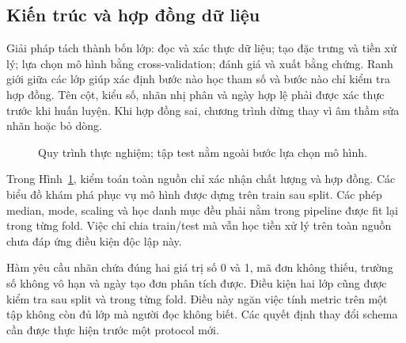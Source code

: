 \subsection{Kiến trúc và hợp đồng dữ liệu}
Giải pháp tách thành bốn lớp: đọc và xác thực dữ liệu; tạo đặc trưng và tiền
xử lý; lựa chọn mô hình bằng cross-validation; đánh giá và xuất bằng chứng.
Ranh giới giữa các lớp giúp xác định bước nào học tham số và bước nào chỉ
kiểm tra hợp đồng. Tên cột, kiểu số, nhãn nhị phân và ngày hợp lệ phải được
xác thực trước khi huấn luyện. Khi hợp đồng sai, chương trình dừng thay vì
âm thầm sửa nhãn hoặc bỏ dòng.

\begin{figure}[!htbp]\centering
{}
\caption{Quy trình thực nghiệm; tập test nằm ngoài bước lựa chọn mô hình.}\label{fig:pipeline}
\end{figure}
Trong Hình~\ref{fig:pipeline}, kiểm toán toàn nguồn chỉ xác nhận chất lượng
và hợp đồng. Các biểu đồ khám phá phục vụ mô hình được dựng trên train sau
split. Các phép median, mode, scaling và học danh mục đều phải nằm trong
pipeline được fit lại trong từng fold. Việc chỉ chia train/test mà vẫn học
tiền xử lý trên toàn nguồn chưa đáp ứng điều kiện độc lập này.

Hàm  yêu cầu nhãn chứa đúng hai giá trị số 0 và 1, mã đơn
không thiếu, trường số không vô hạn và ngày tạo đơn phân tích được. Điều
kiện hai lớp cũng được kiểm tra sau split và trong từng fold. Điều này ngăn
việc tính metric trên một tập không còn đủ lớp mà người đọc không biết.
Các quyết định thay đổi schema cần được thực hiện trước một protocol mới.

